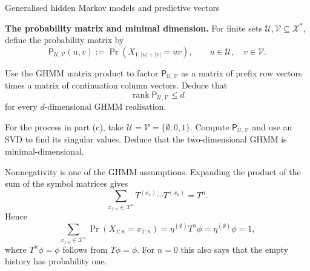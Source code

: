 \begin{exercise}[Extension]{Generalised hidden Markov models and predictive vectors}
\begin{parts}
    \item \textbf{The probability matrix and minimal dimension.}
      For finite sets $\mathcal U,\mathcal V\subseteq\mathcal X^*$, define
      the probability matrix by
      \[
        \mathsf P_{\mathcal U,\mathcal V}(u,v)
          :=\Pr(X_{1:|u|+|v|}=uv),
        \qquad u\in\mathcal U,\quad v\in\mathcal V.
      \]
      \begin{subparts}
        \item Use the GHMM matrix product to factor
          $\mathsf P_{\mathcal U,\mathcal V}$ as a matrix of prefix row
          vectors times a matrix of continuation column vectors. Deduce that
          \[
            \operatorname{rank}\mathsf P_{\mathcal U,\mathcal V}\leq d
          \]
          for every $d$-dimensional GHMM realisation.

        \item For the process in part (c), take
          $\mathcal U=\mathcal V=\{\emptyset,0,1\}$. Compute
          $\mathsf P_{\mathcal U,\mathcal V}$ and use an SVD to find its
          singular values. Deduce that the two-dimensional GHMM is
          minimal-dimensional.
      \end{subparts}

  \end{parts}

  \begin{solution}
    \small
    \begin{parts}
      \item
        \begin{subparts}
          \item Nonnegativity is one of the GHMM assumptions. Expanding the
            product of the sum of the symbol matrices gives
            \[
              \sum_{x_{1:n}\in\mathcal X^n}
                T^{(x_1)}\cdots T^{(x_n)}=T^n.
            \]
            Hence
            \[
              \sum_{x_{1:n}\in\mathcal X^n}
                \Pr(X_{1:n}=x_{1:n})
                =\eta^{(\emptyset)}T^n\phi
                =\eta^{(\emptyset)}\phi=1,
            \]
            where $T^n\phi=\phi$ follows from $T\phi=\phi$. For $n=0$
            this also says that the empty history has probability one.


\end{subparts}
\end{parts}
\end{solution}
\end{exercise}
